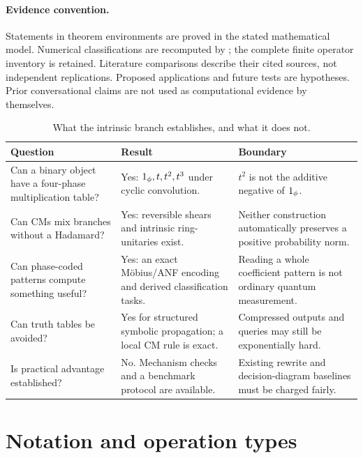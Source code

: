 \paragraph{Evidence convention.}
Statements in theorem environments are proved in the stated mathematical model. Numerical classifications are recomputed by ; the complete finite operator inventory is retained. Literature comparisons describe their cited sources, not independent replications. Proposed applications and future tests are hypotheses. Prior conversational claims are not used as computational evidence by themselves.

\begin{table}[htbp]\centering\small
\begin{tabularx}{\textwidth}{@{}L{0.24\textwidth}Y L{0.25\textwidth}@{}}\toprule
Question & Result & Boundary\\\midrule
Can a binary object have a four-phase multiplication table? & Yes: $1_{\phi},t,t^2,t^3$ under cyclic convolution. & $t^2$ is not the additive negative of $1_{\phi}$.\\
Can CMs mix branches without a Hadamard? & Yes: reversible shears and intrinsic ring-unitaries exist. & Neither construction automatically preserves a positive probability norm.\\
Can phase-coded patterns compute something useful? & Yes: an exact M\"obius/ANF encoding and derived classification tasks. & Reading a whole coefficient pattern is not ordinary quantum measurement.\\
Can truth tables be avoided? & Yes for structured symbolic propagation; a local CM rule is exact. & Compressed outputs and queries may still be exponentially hard.\\
Is practical advantage established? & No. Mechanism checks and a benchmark protocol are available. & Existing rewrite and decision-diagram baselines must be charged fairly.\\\bottomrule
\end{tabularx}
\caption{What the intrinsic branch establishes, and what it does not.}
\end{table}

\section{Notation and operation types}\label{sec:types}
